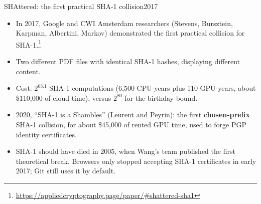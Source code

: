 \ifdefined\PRESENTATION\else\PassOptionsToClass{handout}{beamer}\fi\documentclass[aspectratio=169, lualatex]{beamer}
\begin{document}
\begin{frame}{SHAttered: the first practical SHA-1 collision}{2017}
	\begin{itemize}
		\item In 2017, Google and CWI Amsterdam researchers (Stevens, Bursztein, Karpman, Albertini, Markov) demonstrated the first practical collision for SHA-1.\footnote{\url{https://appliedcryptography.page/paper/\#shattered-sha1}}
		\item Two different PDF files with identical SHA-1 hashes, displaying different content.
		\item Cost: $2^{63.1}$ SHA-1 computations (6,500 CPU-years plus 110 GPU-years, about \$110,000 of cloud time), versus $2^{80}$ for the birthday bound.
		\item 2020, ``SHA-1 is a Shambles'' (Leurent and Peyrin): the first \textbf{chosen-prefix} SHA-1 collision, for about \$45,000 of rented GPU time, used to forge PGP identity certificates.
		\item SHA-1 should have died in 2005, when Wang's team published the first theoretical break. Browsers only stopped accepting SHA-1 certificates in early 2017; Git still uses it by default.
	\end{itemize}
\end{frame}

\end{document}
